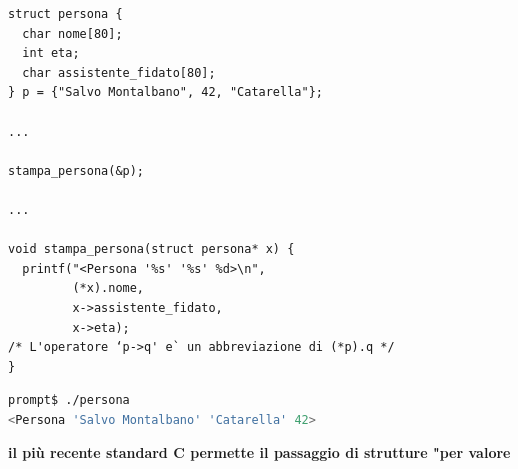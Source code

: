 \documentclass[a4paper,12pt, oneside]{book}
\begin{document}
	\begin{verbatim}
struct persona {
  char nome[80];
  int eta;
  char assistente_fidato[80];
} p = {"Salvo Montalbano", 42, "Catarella"};

...

stampa_persona(&p);

...

void stampa_persona(struct persona* x) {
  printf("<Persona '%s' '%s' %d>\n",
         (*x).nome,
         x->assistente_fidato,
         x->eta);
/* L'operatore ‘p->q' e` un abbreviazione di (*p).q */
}
\end{verbatim}
	\begin{shaded}
		\begin{lstlisting}[language=bash]
prompt$ ./persona
<Persona 'Salvo Montalbano' 'Catarella' 42>
\end{lstlisting}
	\end{shaded}
	\textbf{il più recente standard C permette il passaggio di strutture
		"per valore}
\end{document}
